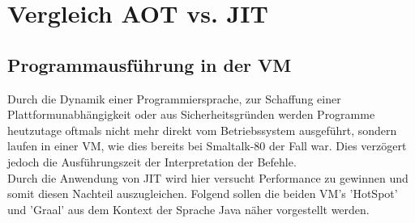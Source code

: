 \chapter{Vergleich AOT vs. JIT}

\section{Programmausführung in der VM} \label{jit_vm}
Durch die Dynamik einer Programmiersprache, zur Schaffung einer Plattformunabhängigkeit oder aus Sicherheitsgründen werden Programme heutzutage oftmals nicht mehr direkt vom Betriebssystem ausgeführt, sondern laufen in einer \ac{VM}, wie dies bereits bei Smaltalk-80 der Fall war. Dies verzögert jedoch die Ausführungszeit der Interpretation der Befehle. \\
Durch die Anwendung von \ac{JIT} wird hier versucht Performance zu gewinnen und somit diesen Nachteil auszugleichen. Folgend sollen die beiden \ac{VM}'s 'HotSpot' und 'Graal' aus dem Kontext der Sprache Java näher vorgestellt werden. 

